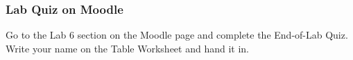 \documentclass[main.tex]{subfiles}
\begin{document}
\subsubsection{Lab Quiz on Moodle}
Go to the Lab 6 section on the Moodle page and complete the End-of-Lab Quiz. Write your name on the Table Worksheet and hand it in.

\end{document}
